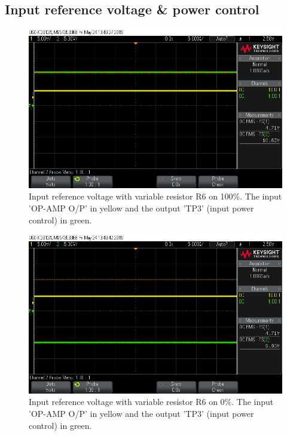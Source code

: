 \subsection{Input reference voltage \& power control}


\begin{figure}[H]
\centering
\includegraphics[width=.9\textwidth]{figures/scope_13.png}
\caption{Input reference voltage with variable resistor R6 on 100\%. The input 'OP-AMP O/P' in yellow and the output 'TP3' (input power control) in green.}
\label{fig:scope_13}
\end{figure}


\begin{figure}[H]
\centering
\includegraphics[width=.9\textwidth]{figures/scope_14.png}
\caption{Input reference voltage with variable resistor R6 on 0\%. The input 'OP-AMP O/P' in yellow and the output 'TP3' (input power control) in green.}
\label{fig:scope_14}
\end{figure}


